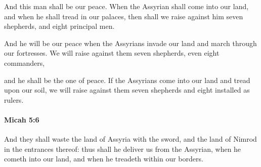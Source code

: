 			\begin{versebox}
					\item[BHS] 
					\item[LXX] 
					\item[ASV] And this man shall be our peace. When the Assyrian shall come into our land, and when he shall tread in our palaces, then shall we raise against him seven shepherds, and eight principal men.
					\item[NIV] And he will be our peace when the Assyrians invade our land and march through our fortresses. We will raise against them seven shepherds, even eight commanders,
					\item[NRSV] and he shall be the one of peace. If the Assyrians come into our land and tread upon our soil, we will raise against them seven shepherds and eight installed as rulers.
			\end{versebox}

		\paragraph{Micah 5:6} %
			\label{MICAH-5-6}

			And they shall waste the land of Assyria with the sword, and the land of Nimrod in the entrances thereof: thus shall he deliver us from the Assyrian, when he cometh into our land, and when he treadeth within our borders.

